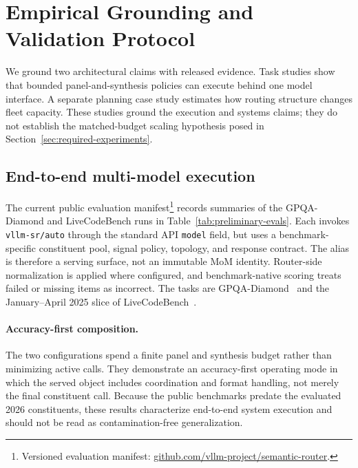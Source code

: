 \section{Empirical Grounding and Validation Protocol}
\label{sec:evidence}

We ground two architectural claims with released evidence. Task studies show
that bounded panel-and-synthesis policies can execute behind one model
interface. A separate planning case study estimates how routing structure changes
fleet capacity. These studies ground the execution and systems claims; they do
not establish the matched-budget scaling hypothesis posed in
Section~\ref{sec:required-experiments}.

\subsection{End-to-end multi-model execution}

The current public evaluation manifest\footnote{Versioned evaluation manifest:
\href{https://github.com/vllm-project/semantic-router/blob/84e7440cf523452c92cb742fca14cb50d27598d3/bench/router_flow/real_eval/current_eval_matrix.json}{github.com/vllm-project/semantic-router}.}
records summaries of the GPQA-Diamond and LiveCodeBench runs in
Table~\ref{tab:preliminary-evals}. Each invokes \texttt{vllm-sr/auto} through the
standard API \texttt{model} field, but uses a benchmark-specific constituent
pool, signal policy, topology, and response contract. The alias is therefore a
serving surface, not an immutable MoM identity. Router-side normalization is
applied where configured, and benchmark-native scoring treats failed or missing
items as incorrect. The tasks are GPQA-Diamond~\citep{rein_2023_gpqa} and the
January--April 2025 slice of LiveCodeBench~\citep{jain_2024_livecodebench}.

\paragraph{Accuracy-first composition.}
The two configurations spend a finite panel and synthesis budget rather than
minimizing active calls. They demonstrate an accuracy-first operating mode in
which the served object includes coordination and format handling, not merely
the final constituent call. Because the public benchmarks predate the evaluated
2026 constituents, these results characterize end-to-end system execution and
should not be read as contamination-free generalization.


